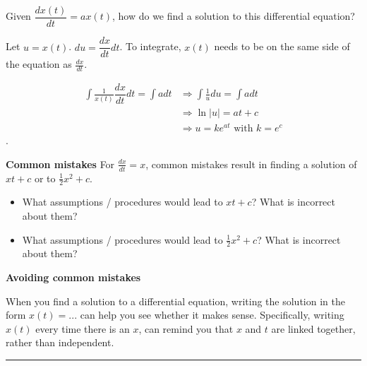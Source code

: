 \documentclass[12pt,letterpaper,noanswers]{exam}
\begin{document}
Given $\dfrac{dx(t)}{dt} = ax(t)$, how do we find a solution to this differential equation?

Let $u = x(t)$.  $du = \dfrac{dx}{dt}dt$.  To integrate, $x(t)$ needs to be on the same side of the equation as $\frac{dx}{dt}$.
    
    
    \begin{align*}
        \displaystyle\int \frac{1}{x(t)}\dfrac{dx}{dt}dt = \int a dt &\Rightarrow \displaystyle\int \frac{1}{u}du = \int a dt\\
       &\Rightarrow \ln\vert u\vert = at + c \\
       &\Rightarrow u = ke^{at} \text{ with } k = e^c
    \end{align*}.
\vspace{0.2in}

\noindent\textbf{Common mistakes}
For $\frac{dx}{dt} = x$, common mistakes result in finding a solution of $xt+c$ or to $\frac{1}{2}x^2+c$.
\begin{itemize}
 \item What assumptions / procedures would lead to $xt+c$?  What is incorrect about them?
 \vspace{0.7in}
 
\item What assumptions / procedures would lead to $\frac{1}{2}x^2+c$?  What is incorrect about them?
\vspace{0.7in}
    \end{itemize}
    
    
\noindent\textbf{Avoiding common mistakes}

When you find a solution to a differential equation, writing the solution in the form $x(t) = ...$ can help you see whether it makes sense.  Specifically, writing $x(t)$ every time there is an $x$, can remind you that $x$ and $t$ are linked together, rather than independent.

\vspace{0.5in}


\vspace{0.2cm}
\hrule
\vspace{0.2cm}


\end{document}
